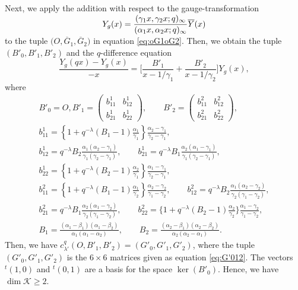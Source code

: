 \documentclass[pdftex]{sigma}
\numberwithin{equation}{section}
\theoremstyle{definition}
\begin{document}
Next, we apply the addition with respect to the gauge-transformation
\[
 Y_g(x) = \smash{\frac{(\gamma_1 x, \gamma_2 x;q)_{\infty}}{(\alpha_1 x, \alpha_2 x;q)_{\infty}}} \overline{Y}(x)
\]
to the tuple $\bigl(O, \overline{G}_1, \overline{G}_2 \bigr) $ in equation \eqref{eq:oG1oG2}.
Then, we obtain the tuple $(B'_0, B'_1, B'_2 ) $ and the $q$-difference equation
\begin{equation*} %
\frac{Y_g(qx) - Y_g(x)}{-x} = \bigg[ \frac{B'_1}{x-1/\gamma_1} + \frac{B'_2}{x-1/\gamma_2} \bigg] Y_g(x) ,
\end{equation*}
where
\begin{gather*}
 B'_0 = O, B'_1 = \begin{pmatrix}
 b^1_{11} & b^1_{12} \\
 b^1_{21} & b^1_{22}
 \end{pmatrix},\qquad
 B'_2
= \begin{pmatrix}
 b^2_{11} & b^2_{12} \\
 b^2_{21} & b^2_{22}
\end{pmatrix},\\
 b^1_{11} = \left\{ 1 + q^{-\lambda} (B_1 - 1) \frac{\alpha_1 }{\gamma_1} \right\} \frac{\alpha_2 - \gamma_1 }{\gamma_2 - \gamma_1} , \\
 b^1_{12} = q^{-\lambda} B_2 \frac{\alpha_1(\alpha_2 - \gamma_1)}{\gamma_1(\gamma_2 - \gamma_1)}, \qquad b^1_{21} = q^{-\lambda}B_1 \frac{\alpha_2(\alpha_1 - \gamma_1)}{\gamma_1(\gamma_2 - \gamma_1)} , \\
 b^1_{22} = \left\{ 1 + q^{-\lambda} (B_2 - 1) \frac{\alpha_2 }{\gamma_1} \right\} \frac{\alpha_1 - \gamma_1 }{\gamma_2 - \gamma_1 } , \\
 b^2_{11} = \left\{ 1 + q^{-\lambda} (B_1 - 1) \frac{\alpha_1 }{\gamma_2} \right\} \frac{\alpha_2 - \gamma_2 }{\gamma_1-\gamma_2},\qquad
 b^2_{12} = q^{-\lambda} B_2 \frac{\alpha_1(\alpha_2 - \gamma_2)}{\gamma_2(\gamma_1 - \gamma_2)} , \\
 b^2_{21} = q^{-\lambda} B_1 \frac{\alpha_2(\alpha_1 - \gamma_2)}{\gamma_2(\gamma_1 - \gamma_2)} , \qquad b^2_{22}= \Big\{ 1 + q^{-\lambda} (B_2 - 1) \frac{\alpha_2 }{\gamma_2} \Big\} \frac{\alpha_1 - \gamma_2 }{\gamma_1-\gamma_2} , \\
 B_1= \frac{(\alpha_1-\beta_1)(\alpha_1-\beta_2)}{\alpha_1(\alpha_1-\alpha_2)},\qquad B_2=\frac{(\alpha_2-\beta_1)(\alpha_2-\beta_2)}{\alpha_2(\alpha_2-\alpha_1)}.
\end{gather*}
Then, we have $c^q_{\lambda'} (O, B'_1, B'_2) = (G'_0, G'_1, G'_2)$, where the tuple $(G'_0, G'_1, G'_2)$ is the $6 \times 6$ matrices given as equation \eqref{eq:G'012}.
The vectors ${}^t(1, 0)$ and ${}^t(0, 1)$ are a basis for the space $\ker (B'_0)$.
Hence, we have $\dim \mathcal{K} \geq 2 $.
\end{document}
